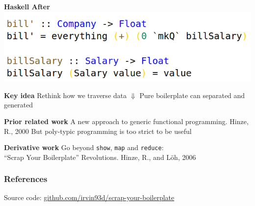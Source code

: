 \documentclass[14pt]{beamer}
\begin{document}
\begin{frame}
  \centering\textbf{Haskell After}
  \vfill
  \includegraphics[height=0.8\textheight,width=\textwidth,keepaspectratio]{graphics/bill-hs.png}
  \vfill
\end{frame}

\begin{frame}
  \vfill
  \centering\textbf{Key idea}
  \vfill
  \centering
  Rethink how we traverse data
  \vfill
  $\Downarrow$
  \vfill
  Pure boilerplate can separated and generated
  \vfill
\end{frame}

\begin{frame}
  \centering\textbf{Prior related work}
  \vfill
  A new approach to generic functional programming. Hinze, R., 2000 \cite{hinze2000new}
  \vfill
  \small{But poly-typic programming is too strict to be useful}
  \vfill
\end{frame}

\begin{frame}
  \centering\textbf{Derivative work}
  \vfill
  Go beyond \texttt{show}, \texttt{map} and \texttt{reduce}:\\
  \vfill
  ``Scrap Your Boilerplate'' Revolutions. Hinze, R., and L\"{o}h, 2006 \cite{hinze2006scrap}
  \vfill
\end{frame}

\begin{frame}[fragile]\frametitle{References}
  
  \small{Source code: \href{https://github.com/irvin93d/scrap-your-boilerplate}{github.com/irvin93d/scrap-your-boilerplate}}
\end{frame}
\end{document}

